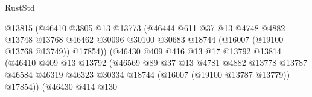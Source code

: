 \begin{lexlean}{RustStd}
\begin{coremodule}
                                          @13815
                                          (@46410
                                            @3805
                                            @13
                                            @13773
                                            (@46444
                                              @611
                                              @37
                                              @13
                                              @4748
                                              @4882
                                              @13748
                                              @13768
                                              @46462
                                              @30096
                                              @30100
                                              @30683
                                              @18744
                                              (@16007 (@19100 @13768 @13749))
                                              @17854))
                                          (@46430
                                            @409
                                            @416
                                            @13
                                            @17
                                            @13792
                                            @13814
                                            (@46410
                                              @409
                                              @13
                                              @13792
                                              (@46569
                                                @89
                                                @37
                                                @13
                                                @4781
                                                @4882
                                                @13778
                                                @13787
                                                @46584
                                                @46319
                                                @46323
                                                @30334
                                                @18744
                                                (@16007 (@19100 @13787 @13779))
                                                @17854))
                                            (@46430
                                              @414
                                              @130

\end{coremodule}
\end{lexlean}
